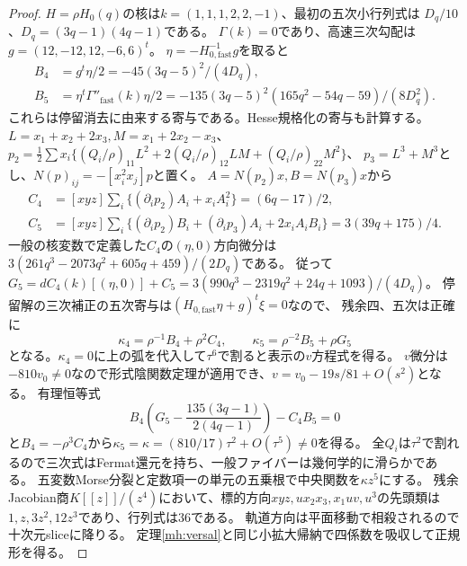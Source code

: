 \begin{proof}
$H=\rho H_0(q)$の核は$k=(1,1,1,2,2,-1)$、最初の五次小行列式は
$D_q/10$、$D_q=(3q-1)(4q-1)$である。
$\Gamma(k)=0$であり、高速三次勾配は$g=(12,-12,12,-6,6)^t$。
$\eta=-H_{0,\mathrm{fast}}^{-1}g$を取ると
\begin{align*}
 B_4&=g^t\eta/2=-45(3q-5)^2/(4D_q),\\
 B_5&=\eta^t\Gamma''_{\mathrm{fast}}(k)\eta/2
 =-135(3q-5)^2(165q^2-54q-59)/(8D_q^2).
\end{align*}
これらは停留消去に由来する寄与である。Hesse規格化の寄与も計算する。
$L=x_1+x_2+2x_3,M=x_1+2x_2-x_3$、
$p_2=\tfrac12\sum x_i\{(Q_i/\rho)_{11}L^2+2(Q_i/\rho)_{12}LM+(Q_i/\rho)_{22}M^2\}$、
$p_3=L^3+M^3$とし、$N(p)_{ij}=-[x_i^2x_j]p$と置く。
$A=N(p_2)x,B=N(p_3)x$から
\begin{align*}
 C_4&=[xyz]\sum_i\{(\partial_i p_2)A_i+x_iA_i^2\}=(6q-17)/2,\\
 C_5&=[xyz]\sum_i\{(\partial_i p_2)B_i+(\partial_i p_3)A_i+2x_iA_iB_i\}
 =3(39q+175)/4.
\end{align*}
一般の核変数で定義した$C_4$の$(\eta,0)$方向微分は
$3(261q^3-2073q^2+605q+459)/(2D_q)$である。
従って$G_5=dC_4(k)[(\eta,0)]+C_5
=3(990q^3-2319q^2+24q+1093)/(4D_q)$。
停留解の三次補正の五次寄与は$(H_{0,\mathrm{fast}}\eta+g)^t\xi=0$なので、
残余四、五次は正確に
\[
 \kappa_4=\rho^{-1}B_4+\rho^2C_4,\qquad
 \kappa_5=\rho^{-2}B_5+\rho G_5
\]
となる。$\kappa_4=0$に上の弧を代入して$\tau^6$で割ると表示の$v$方程式を得る。
$v$微分は$-810v_0\ne0$なので形式陰関数定理が適用でき、$v=v_0-19s/81+O(s^2)$となる。
有理恒等式
\[
 B_4\left(G_5-\frac{135(3q-1)}{2(4q-1)}\right)-C_4B_5=0
\]
と$B_4=-\rho^3C_4$から$\kappa_5=\kappa=(810/17)\tau^2+O(\tau^5)\ne0$を得る。
全$Q_i$は$\tau^2$で割れるので三次式はFermat還元を持ち、一般ファイバーは幾何学的に滑らかである。
五変数Morse分裂と定数項一の単元の五乗根で中央関数を$\kappa z^5$にする。
残余Jacobian商$K[[z]]/(z^4)$において、標的方向$xyz,ux_2x_3,x_1uv,u^3$の先頭類は
$1,z,3z^2,12z^3$であり、行列式は$36$である。
軌道方向は平面移動で相殺されるので十次元sliceに降りる。
定理\ref{mh:versal}と同じ小拡大帰納で四係数を吸収して正規形を得る。
\end{proof}


